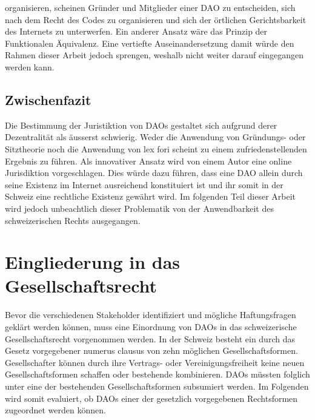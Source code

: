 \documentclass[a4paper,12pt]{report}
\begin{document}
organisieren, scheinen Gründer und Mitglieder einer DAO zu entscheiden, sich nach dem Recht des Codes zu organisieren und sich der örtlichen Gerichtsbarkeit des Internets zu unterwerfen. Ein anderer Ansatz wäre das Prinzip der Funktionalen Äquivalenz. Eine vertiefte Auseinandersetzung damit würde den Rahmen dieser Arbeit jedoch sprengen, weshalb nicht weiter darauf eingegangen werden kann. 
	\closesection
	
	\subsection{Zwischenfazit}
	\startsubsection
		Die Bestimmung der Juristiktion von DAOs gestaltet sich aufgrund derer Dezentralität als äusserst schwierig. Weder die Anwendung von Gründungs- oder Sitztheorie noch die Anwendung von lex fori scheint zu einem zufriedenstellenden Ergebnis zu führen. Als innovativer Ansatz wird von einem Autor eine online Jurisdiktion vorgeschlagen. Dies würde dazu führen, dass eine DAO allein durch seine Existenz im Internet ausreichend konstituiert ist und ihr somit in der Schweiz eine rechtliche Existenz gewährt wird. Im folgenden Teil dieser Arbeit wird jedoch unbeachtlich dieser Problematik von der Anwendbarkeit des schweizerischen Rechts ausgegangen.
	\closesection
    
	\closesection
	
	\section{Eingliederung in das Gesellschaftsrecht}
	\startsection
    Bevor die verschiedenen Stakeholder identifiziert und mögliche Haftungsfragen geklärt werden können, muss eine Einordnung von DAOs in das schweizerische Gesellschaftsrecht vorgenommen werden. In der Schweiz besteht ein durch das Gesetz vorgegebener numerus clausus von zehn möglichen Gesellschaftsformen. Gesellschafter können durch ihre Vertrags- oder Vereinigungsfreiheit keine neuen Gesellschaftsformen schaffen oder bestehende kombinieren. DAOs müssten folglich unter eine der bestehenden Gesellschaftsformen subsumiert werden. Im Folgenden wird somit evaluiert, ob DAOs einer der gesetzlich vorgegebenen Rechtsformen zugeordnet werden können. 
	
\end{document}
